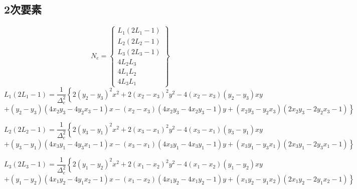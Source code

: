 \documentclass{jarticle}
\begin{document}
\subsection{2次要素}
\begin{equation}
N_e = \left\{\begin{array}{c}
      L_1(2L_1-1)\\
      L_2(2L_2-1)\\
      L_3(2L_3-1)\\
      4L_2L_3\\
      4L_1L_2\\
      4L_3L_1
\end{array}\right\}
\end{equation}
\[
  L_1(2L_1-1)= \frac{1}{\Delta_e^2}\left\{
  2(y_2-y_3)^2x^2+2(x_2-x_3)^2y^2-4(x_2-x_3)(y_2-y_3)xy\right.
\]
\[\left.
+(y_2-y_3)(4x_2y_3-4y_2x_3-1)x-(x_2-x_3)(4x_2y_3-4x_2y_3-1)y+(x_2y_3-y_2x_3)(2x_2y_3-2y_2x_3-1)\right\}
\]

\[
  L_2(2L_2-1)= \frac{1}{\Delta_e^2}\left\{
  2(y_3-y_1)^2x^2+2(x_3-x_1)^2y^2-4(x_3-x_1)(y_3-y_1)xy\right.
\]
\[\left.
+(y_3-y_1)(4x_3y_1-4y_3x_1-1)x-(x_3-x_1)(4x_3y_1-4x_3y_1-1)y+(x_3y_1-y_3x_1)(2x_3y_1-2y_3x_1-1)\right\}
\]

\[
  L_3(2L_3-1)= \frac{1}{\Delta_e^2}\left\{
  2(y_1-y_2)^2x^2+2(x_1-x_2)^2y^2-4(x_1-x_2)(y_1-y_2)xy\right.
\]
\[\left.
+(y_1-y_2)(4x_1y_2-4y_1x_2-1)x-(x_1-x_2)(4x_1y_2-4x_1y_2-1)y+(x_1y_2-y_1x_2)(2x_1y_2-2y_1x_2-1)\right\}
\]
\end{document}
